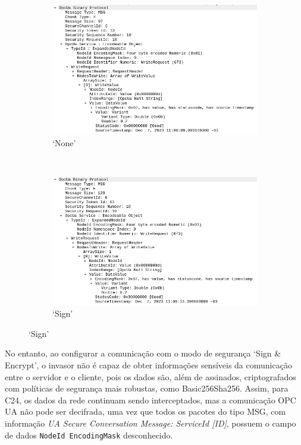 \begin{figure}[htbp!]
    \centering
    \caption{\label{fig:writeRequest}Informações obtidas pelo invasor com modo de segurança `None' e `Sign'}
    \begin{subfigure}[t]{0.5\textwidth}
        \centering
        \caption{`None'}
        \includegraphics[width=1\textwidth]{USPSC-img/0-sniffing-WriteRequest.png}
    \end{subfigure}%
    ~ 
    \begin{subfigure}[t]{0.5\textwidth}
        \centering
        \caption{`Sign'}
        \includegraphics[width=1\textwidth]{USPSC-img/1-sniffing-WriteRequest.png}
    \end{subfigure}%
\end{figure}

No entanto, ao configurar a comunicação com o modo de segurança `Sign \& Encrypt', o invasor não é capaz de obter informações sensíveis da comunicação entre o servidor e o cliente, pois os dados são, além de assinados, criptografados com políticas de segurança mais robustas, como Basic256Sha256. Assim, para C24, os dados da rede continuam sendo interceptados, mas a comunicação OPC UA não pode ser decifrada, uma vez que todos os pacotes do tipo MSG, com informação \textit{UA Secure Conversation Message: ServiceId [ID]}, possuem o campo de dados \texttt{NodeId EncodingMask} desconhecido.

